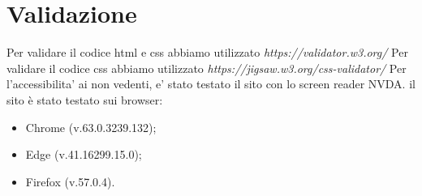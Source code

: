\section{Validazione}
Per validare il codice html e css abbiamo utilizzato \emph{https://validator.w3.org/} \newline
Per validare il codice css abbiamo utilizzato \emph{https://jigsaw.w3.org/css-validator/} \newline
Per l'accessibilita' ai non vedenti, e' stato testato il sito con lo screen reader NVDA.\newline
il sito è stato testato sui browser:
\begin{itemize}
    \item Chrome (v.63.0.3239.132);
    \item Edge (v.41.16299.15.0);
    \item Firefox (v.57.0.4).	
\end{itemize}
